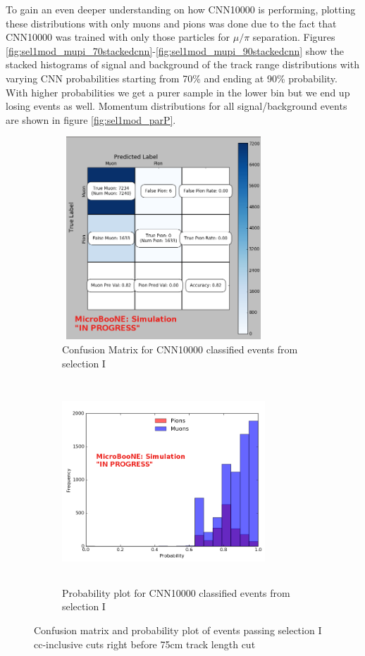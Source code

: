 To gain an even deeper understanding on how CNN10000 is performing, plotting these distributions with only muons and pions was done due to the fact that CNN10000 was trained with only those particles for $\mu/\pi$ separation. Figures \ref{fig:sel1mod_mupi_70stackedcnn}-\ref{fig:sel1mod_mupi_90stackedcnn} show the stacked histograms of signal and background of the track range distributions with varying CNN probabilities starting from 70\% and ending at 90\% probability. With higher probabilities we get a purer sample in the lower bin but we end up losing events as well. Momentum distributions for all signal/background events are shown in figure \ref{fig:sel1mod_parP}.    

\begin{figure}[htp!]
\centering
	\begin{subfigure}[b]{.45\textwidth}
	\includegraphics[width=3in,height=3in]{figs/sel1mod_confusion_wrongnorm.png}
	\caption{Confusion Matrix for CNN10000 classified events from selection I}
	\label{fig:confusion_sel1mod}
	\end{subfigure}
	\quad
	\begin{subfigure}[b]{.45\textwidth}
	\includegraphics[width=3in,height=3in]{figs/probplot_wrongnorm_selImod.png}
	\caption{Probability plot for CNN10000 classified events from selection I}  
	\label{fig:prob_sel1mod}
	\end{subfigure}
	\quad
\caption{Confusion matrix and probability plot of events passing selection I cc-inclusive cuts right before 75cm track length cut}
\label{probplots}
\end{figure}


